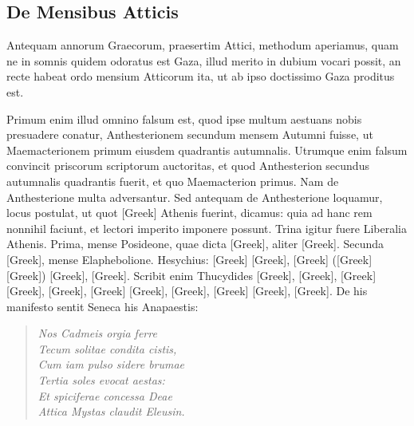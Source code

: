 \subsection{De Mensibus Atticis}
Antequam annorum Graecorum, praesertim Attici, methodum
aperiamus, quam ne in somnis quidem odoratus est Gaza,
illud merito in dubium vocari possit, an recte habeat ordo mensium
Atticorum ita, ut ab ipso doctissimo Gaza proditus est.

Primum enim
illud omnino falsum est, quod ipse multum aestuans nobis presuadere
conatur, Anthesterionem secundum mensem Autumni fuisse, ut Maemacterionem
primum eiusdem quadrantis autumnalis.
Utrumque
enim falsum convincit priscorum scriptorum auctoritas, et quod Anthesterion
secundus autumnalis quadrantis fuerit, et quo Maemacterion
primus.
Nam de Anthesterione multa adversantur.
Sed antequam de Anthesterione loquamur, locus postulat, ut quot
 \textgreek{[Greek]}
Athenis fuerint, dicamus: quia ad hanc rem nonnihil faciunt, et lectori
imperito imponere possunt.
Trina igitur fuere Liberalia Athenis.
Prima, mense Posideone, quae dicta \textgreek{[Greek]},
 aliter \textgreek{[Greek]}.
Secunda \textgreek{[Greek]}, mense Elaphebolione.
Hesychius: \textgreek{[Greek]}
\textgreek{[Greek]}, \textgreek{[Greek]} (\textgreek{[Greek]}
\textgreek{[Greek]}) \textgreek{[Greek]}, \textgreek{[Greek]}.
Scribit enim
Thucydides \textgreek{[Greek]}, \textgreek{[Greek]}, \textgreek{[Greek]}
\textgreek{[Greek]}, \textgreek{[Greek]}, \textgreek{[Greek]}
\textgreek{[Greek]}, \textgreek{[Greek]}, \textgreek{[Greek]}
\textgreek{[Greek]}, \textgreek{[Greek]}.
De his manifesto sentit Seneca his Anapaestis:
\begin{quote}
  \emph{Nos Cadmeis orgia ferre\\
  Tecum solitae condita cistis,\\
  Cum iam pulso sidere brumae\\
  Tertia soles evocat aestas:\\
  Et spiciferae concessa Deae\\
  Attica Mystas claudit Eleusin.}
\end{quote}
